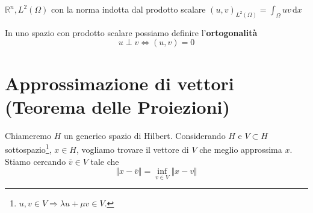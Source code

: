 \documentclass[10pt,a4paper,twoside,openright]{book}
\newcommand{\de}{\,\mathrm d}
\newcommand{\dx}{\de x}
\begin{document}
$\mathbb{R}^{n},L^{2}(\Omega)$ con la norma indotta dal prodotto scalare $(u,v)_{L^{2}(\Omega)} =\int _{\Omega } uv\dx$

In uno spazio con prodotto scalare possiamo definire l'\textbf{ortogonalità}
\begin{equation*}
	u\perp v\Leftrightarrow (u,v) =0
\end{equation*}
\section{Approssimazione di vettori (Teorema delle Proiezioni)}

Chiameremo $H$ un generico spazio di Hilbert. Considerando $H$ e $V\subset H$ sottospazio\footnote{$u,v\in V\Rightarrow \lambda u+\mu v\in V$.}, $x\in H$, vogliamo trovare il vettore di $V$ che meglio approssima $x$. Stiamo cercando $\overline{v} \in V$ tale che
\begin{equation*}
	\Vert x-\overline{v}\Vert =\inf_{v\in V}\Vert x-v\Vert 
\end{equation*}
\end{document}

